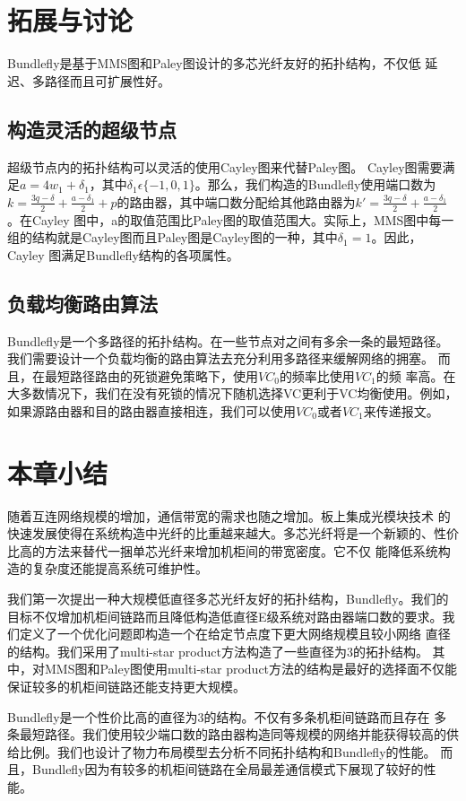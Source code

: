     \section{拓展与讨论}
   Bundlefly是基于MMS图和Paley图设计的多芯光纤友好的拓扑结构，不仅低
   延迟、多路径而且可扩展性好。

   \subsection{构造灵活的超级节点}

   超级节点内的拓扑结构可以灵活的使用Cayley图来代替Paley图。
   Cayley图需要满足$a=4w_{1}+\delta_{1}$，其中$\delta_{1}\epsilon\{-1,0,1\}$。那么，我们构造的Bundlefly使用端口数为$k=\frac{3q-\delta}{2}+\frac{a-\delta_1}{2}+p$的路由器，其中端口数分配给其他路由器为$k'=\frac{3q-\delta}{2}+\frac{a-\delta_1}{2}$。在Cayley
   图中，a的取值范围比Paley图的取值范围大。实际上，MMS图中每一组的结构就是Cayley图而且Paley图是Cayley图的一种，其中$\delta_1=1$。因此，Cayley
   图满足Bundlefly结构的各项属性。

   \subsection{负载均衡路由算法}

   Bundlefly是一个多路径的拓扑结构。在一些节点对之间有多余一条的最短路径。我们需要设计一个负载均衡的路由算法去充分利用多路径来缓解网络的拥塞。
   而且，在最短路径路由的死锁避免策略下，使用$VC_0$的频率比使用$VC_1$的频
   率高。在大多数情况下，我们在没有死锁的情况下随机选择VC更利于VC均衡使用。例如，如果源路由器和目的路由器直接相连，我们可以使用$VC_0$或者$VC_1$来传递报文。

    \section{本章小结}

    随着互连网络规模的增加，通信带宽的需求也随之增加。板上集成光模块技术 的快速发展使得在系统构造中光纤的比重越来越大。多芯光纤将是一个新颖的、性价比高的方法来替代一捆单芯光纤来增加机柜间的带宽密度。它不仅
    能降低系统构造的复杂度还能提高系统可维护性。

    我们第一次提出一种大规模低直径多芯光纤友好的拓扑结构，Bundlefly。我们的目标不仅增加机柜间链路而且降低构造低直径E级系统对路由器端口数的要求。我们定义了一个优化问题即构造一个在给定节点度下更大网络规模且较小网络
    直径的结构。我们采用了multi-star product方法构造了一些直径为3的拓扑结构。
    其中，对MMS图和Paley图使用multi-star product方法的结构是最好的选择面不仅能保证较多的机柜间链路还能支持更大规模。

    Bundlefly是一个性价比高的直径为3的结构。不仅有多条机柜间链路而且存在
    多条最短路径。我们使用较少端口数的路由器构造同等规模的网络并能获得较高的供给比例。我们也设计了物力布局模型去分析不同拓扑结构和Bundlefly的性能。
    而且，Bundlefly因为有较多的机柜间链路在全局最差通信模式下展现了较好的性能。


